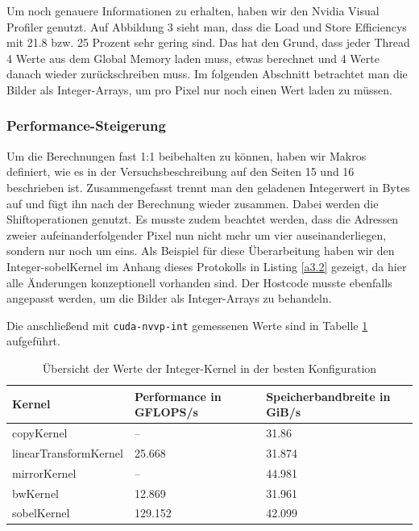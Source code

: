 \documentclass[12pt,a4paper]{scrartcl}
\begin{document}
Um noch genauere Informationen zu erhalten, haben wir den Nvidia Visual Profiler genutzt.
Auf Abbildung 3 sieht man, dass die Load und Store Efficiencys mit 21.8 bzw. 25 Prozent sehr gering sind.
Das hat den Grund, dass jeder Thread 4 Werte aus dem Global Memory laden muss, etwas berechnet und 4 Werte danach wieder zur\"uckschreiben muss.
Im folgenden Abschnitt betrachtet man die Bilder als Integer-Arrays, um pro Pixel nur noch einen Wert laden zu m\"ussen.

\subsubsection{Performance-Steigerung}
Um die Berechnungen fast 1:1 beibehalten zu k\"onnen, haben wir Makros definiert, wie es in der Versuchsbeschreibung auf den Seiten 15 und 16 beschrieben ist.
Zusammengefasst trennt man den geladenen Integerwert in Bytes auf und f\"ugt ihn nach der Berechnung wieder zusammen.
Dabei werden die Shiftoperationen genutzt.
Es musste zudem beachtet werden, dass die Adressen zweier aufeinanderfolgender Pixel nun nicht mehr um vier auseinanderliegen, sondern nur noch um eins.
Als Beispiel f\"ur diese \"Uberarbeitung haben wir den Integer-sobelKernel im Anhang dieses Protokolls in Listing \ref{a3.2} gezeigt, da hier alle \"Anderungen konzeptionell vorhanden sind.
Der Hostcode musste ebenfalls angepasst werden, um die Bilder als Integer-Arrays zu behandeln.

Die anschlie\ss{}end mit \texttt{cuda-nvvp-int} gemessenen Werte sind in Tabelle \ref{tab:perf-int} aufgef\"uhrt.

\begin{table}[h]
    \centering
    \begin{tabular}{l|l|l}
    \hline
    Kernel & Performance in GFLOPS/s & Speicherbandbreite in GiB/s \\
    \hline
    copyKernel & --                  & 31.86  \\
    linearTransformKernel & 25.668   & 31.874 \\
    mirrorKernel & --                & 44.981 \\
    bwKernel & 12.869                & 31.961 \\
    sobelKernel & 129.152            & 42.099 \\
    \hline
    \end{tabular}
    \caption{\"Ubersicht der Werte der Integer-Kernel in der besten Konfiguration}
    \label{tab:perf-int}
\end{table}
\end{document}
